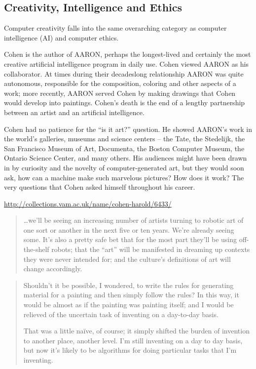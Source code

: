 \subsection{Creativity, Intelligence and Ethics}

Computer creativity falls into the same overarching category as computer intelligence (\ac{AI}) and computer ethics.




Cohen is the author of AARON, perhaps the longest-lived and certainly the most creative artificial intelligence program in daily use. Cohen viewed AARON as his collaborator. At times during their decadeslong relationship AARON was quite autonomous, responsible for the composition, coloring and other aspects of a work; more recently, AARON served Cohen by making drawings that Cohen would develop into paintings. Cohen's death is the end of a lengthy partnership between an artist and an artificial intelligence.\autocite{Cohen2016}

Cohen had no patience for the ``is it art?'' question. He showed AARON's work in the world's galleries, museums and science centers -- the Tate, the Stedelijk, the San Francisco Museum of Art, Documenta, the Boston Computer Museum, the Ontario Science Center, and many others. His audiences might have been drawn in by curiosity and the novelty of computer-generated art, but they would soon ask, how can a machine make such marvelous pictures? How does it work? The very questions that Cohen asked himself throughout his career.\autocite{Cohen2016}


\url{http://collections.vam.ac.uk/name/cohen-harold/6433/}

\begin{quotation}
  \ldots we'll be seeing an increasing number of artists turning to robotic art of one sort or another in the next five or ten years. We're already seeing some. It's also a pretty safe bet that for the most part they'll be using off-the-shelf robots; that the ``art'' will be manifested in dreaming up contexts they were never intended for; and the culture's definitions of art will change accordingly.
\end{quotation}

\begin{quotation}
  Shouldn't it be possible, I wondered, to write the rules for generating material for a painting and then simply follow the rules?  In this way, it would be almost as if the painting was painting itself; and I would be relieved of the uncertain task of inventing on a day-to-day basis. 

  That was a little naïve, of course; it simply shifted the burden of invention to another place, another level. I'm still inventing on a day to day basis, but now it's likely to be algorithms for doing particular tasks that I'm inventing.
\end{quotation}

